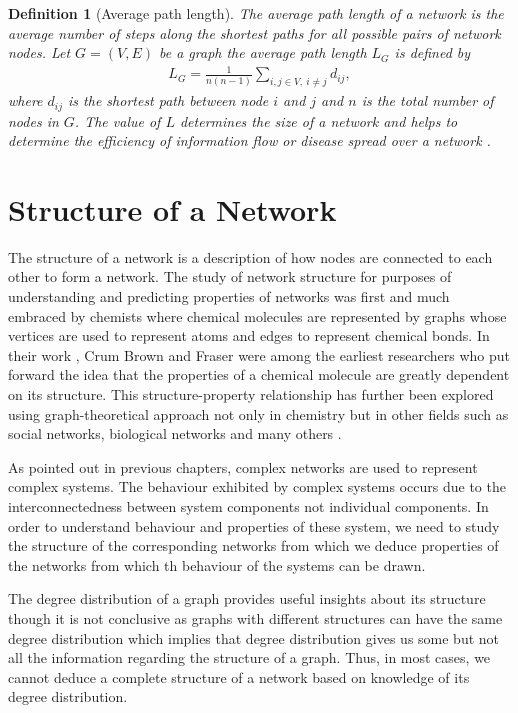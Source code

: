 \documentclass[10pt,a4paper]{article}
\newtheorem{defn}{Definition}
\begin{document}
\begin{defn}[Average path length]
	The average path length of a network is the average number of steps along the shortest paths for all possible pairs of network nodes. Let $G = (V , E )$ be a graph the average path length $L_G$ is defined by
	\begin{eqnarray}
	L_G = \frac{1}{n(n-1)} \sum_{i,j \in V,~i \neq j} d_{ij},
	\end{eqnarray}
	where $d_{ij}$ is the shortest path between node $i$ and $j$ and $n$ is the total number of nodes in $G$. The value of $L$ determines the size of a network and helps to determine the efficiency of information flow or disease spread over a network \citep{wang2003complex}.
\end{defn}

\section{Structure of a Network}

The structure of a network is a description of how nodes are connected to each other to form a network. 
The study of network structure for purposes of understanding and predicting properties of networks was first and much embraced by chemists where chemical molecules are represented by graphs whose vertices are used to represent atoms and edges to represent chemical
bonds.  In their work \citep{brown1868connection}, Crum Brown and Fraser were among the earliest researchers who put forward the idea that the properties of a chemical molecule are greatly dependent on its structure.  This structure-property relationship has further been explored using graph-theoretical approach not only in chemistry but in other fields such as social networks, biological networks and many others \citep{mihalic1992graph,smith2004associations,wellman1988social,wey2008social}.  

As pointed out in previous chapters, complex networks are used to represent complex systems. The behaviour exhibited by complex systems occurs due to the interconnectedness between system components not individual components. In order to understand behaviour and properties of these system, we need to study the structure of the corresponding networks from which we deduce properties of the networks from which th behaviour of the systems can be drawn.

The degree distribution of a graph provides useful insights about its structure though it is not conclusive as 
graphs with different structures can have the same degree distribution which implies that degree distribution gives us some but not all the information regarding the structure
of a graph. Thus, in most cases, we cannot deduce a complete structure of a network based on knowledge of
its degree distribution.
\end{document}
